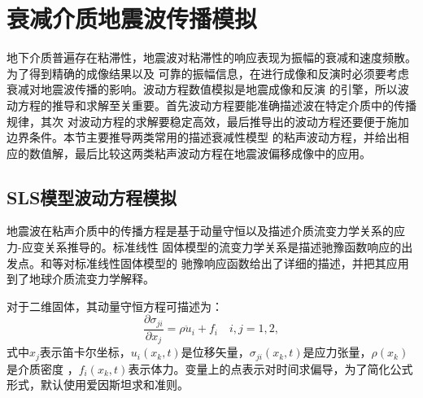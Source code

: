 \vspace{0.5cm}
\section{衰减介质地震波传播模拟}
\vspace{0.5cm}
地下介质普遍存在粘滞性，地震波对粘滞性的响应表现为振幅的衰减和速度频散。为了得到精确的成像结果以及
可靠的振幅信息，在进行成像和反演时必须要考虑衰减对地震波传播的影响。波动方程数值模拟是地震成像和反演
的引擎，所以波动方程的推导和求解至关重要。首先波动方程要能准确描述波在特定介质中的传播规律，其次
对波动方程的求解要稳定高效，最后推导出的波动方程还要便于施加边界条件。本节主要推导两类常用的描述衰减性模型
的粘声波动方程，并给出相应的数值解，最后比较这两类粘声波动方程在地震波偏移成像中的应用。

\subsection{SLS模型波动方程模拟}
地震波在粘声介质中的传播方程是基于动量守恒以及描述介质流变力学关系的应力-应变关系推导的。标准线性
固体模型的流变力学关系是描述驰豫函数响应的出发点。和等对标准线性固体模型的
驰豫响应函数给出了详细的描述，并把其应用到了地球介质流变力学解释。

对于二维固体，其动量守恒方程可描述为：
\begin{equation}
	\frac{\partial\sigma_{ji}}{\partial x_j}=\rho\ddot{u}_i+f_i \quad i,j=1,2,
	\label{eq:dl}
\end{equation}
式中$x_j$表示笛卡尔坐标，$u_i(x_k,t)$是位移矢量，$\sigma_{ji}(x_k,t)$是应力张量，$\rho(x_k)$是介质密度
，$f_i(x_k,t)$表示体力。变量上的点表示对时间求偏导，为了简化公式形式，默认使用爱因斯坦求和准则。

